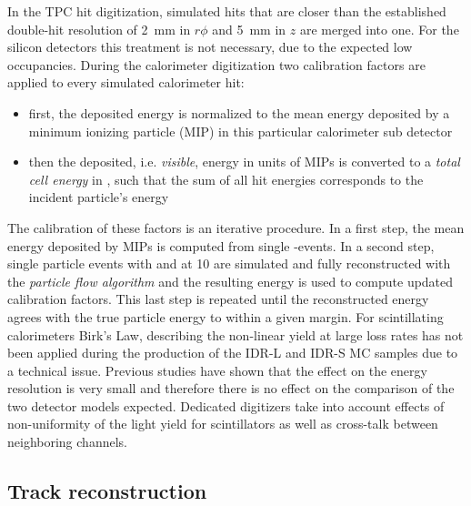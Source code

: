 In the TPC hit digitization, simulated hits that are closer than the established double-hit resolution
of 2~mm in $r\phi$ and 5~mm in $z$ are merged into one.
For the silicon detectors this treatment is not necessary, due to the expected low occupancies.
%
During the calorimeter digitization two calibration factors are applied to every simulated calorimeter hit:
\begin{itemize}
\item first, the deposited energy is normalized to the mean energy deposited by a minimum ionizing particle (MIP) in this particular calorimeter
  sub detector
\item  then the deposited, i.e. \emph{visible}, energy in units of MIPs is converted to a \emph{total cell energy} in \GeV, such that the
  sum of all hit energies corresponds to the incident particle's energy
\end{itemize}

The calibration of these factors is an iterative procedure. In a first step, the mean energy deposited by MIPs is computed from single \Pmuon-events.
In a second step, single particle events with \Pphoton and \PKzL at  \unit{10}{\GeV} are simulated and fully reconstructed with the \emph{particle flow algorithm}
and the resulting energy is used to compute updated calibration factors. This last step is repeated until the reconstructed energy agrees with the true particle
energy to within a given margin.
%
For scintillating calorimeters Birk's Law, describing the non-linear yield at large loss rates has not been  applied during the production of the IDR-L and IDR-S MC samples due to a technical issue. Previous studies have shown that the effect on the energy resolution is very small and therefore there is no effect on the comparison of the two detector models expected.
Dedicated digitizers take into account
effects of non-uniformity of the light yield for scintillators as well as cross-talk between
neighboring channels.

\subsection{Track reconstruction}

